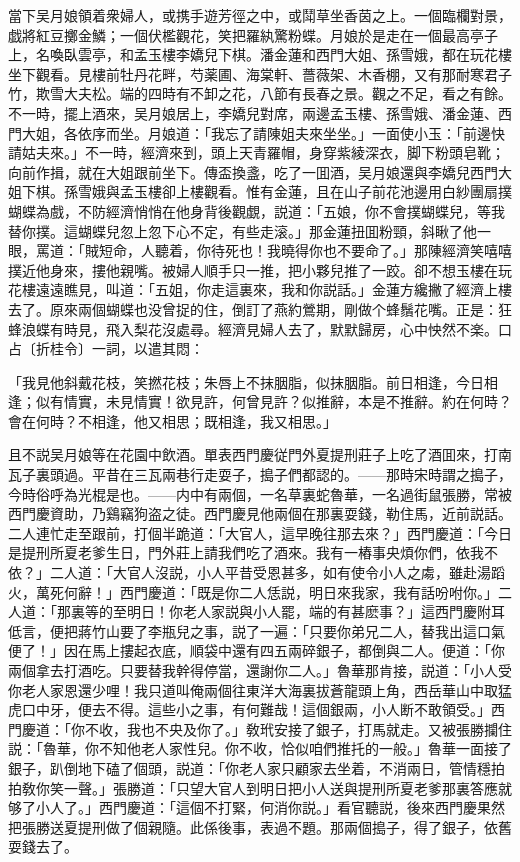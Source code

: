 當下吴月娘領着衆婦人，或携手遊芳徑之中，或鬦草坐香茵之上。一個臨欄對景，戯將紅豆擲金鱗；一個伏檻觀花，笑把羅紈驚粉蝶。月娘於是走在一個最高亭子上，名喚臥雲亭，和孟玉樓李嬌兒下棋。潘金蓮和西門大姐、孫雪娥，都在玩花樓坐下觀看。見樓前牡丹花畔，芍薬圃、海棠軒、薔薇架、木香棚，又有那耐寒君子竹，欺雪大夫松。端的四時有不卸之花，八節有長春之景。觀之不足，看之有餘。不一時，擺上酒來，吴月娘居上，李嬌兒對席，兩邊孟玉樓、孫雪娥、潘金蓮、西門大姐，各依序而坐。月娘道：「我忘了請陳姐夫來坐坐。」一面使小玉：「前邊快請姑夫來。」不一時，經濟來到，頭上天青羅帽，身穿紫綾深衣，脚下粉頭皂靴；向前作揖，就在大姐跟前坐下。傳盃換盞，吃了一囬酒，吴月娘還與李嬌兒西門大姐下棋。孫雪娥與孟玉樓卻上樓觀看。惟有金蓮，且在山子前花池邊用白紗團扇撲蝴蝶為戲，不防經濟悄悄在他身背後觀覷，説道：「五娘，你不會撲蝴蝶兒，等我替你撲。這蝴蝶兒忽上忽下心不定，有些走滚。」那金蓮扭囬粉頸，斜瞅了他一眼，罵道：「賊短命，人聽着，你待死也！我曉得你也不要命了。」那陳經濟笑嘻嘻撲近他身來，摟他親嘴。被婦人順手只一推，把小夥兒推了一跤。卻不想玉樓在玩花樓遠遠瞧見，叫道：「五姐，你走這裏來，我和你説話。」金蓮方纔撇了經濟上樓去了。原來兩個蝴蝶也没曾捉的住，倒訂了燕約鶯期，剛做个蜂鬚花嘴。正是：狂蜂浪蝶有時見，飛入梨花沒處尋。經濟見婦人去了，默默歸房，心中怏然不楽。口占〔折桂令〕一詞，以遣其悶：

\begin{myquote}
「我見他斜戴花枝，笑撚花枝；朱唇上不抹胭脂，似抹胭脂。前日相逢，今日相逢；似有情實，未見情實！欲見許，何曾見許？似推辭，本是不推辭。約在何時？會在何時？不相逢，他又相思；既相逢，我又相思。」
\end{myquote}

且不説吴月娘等在花園中飲酒。單表西門慶従門外夏提刑莊子上吃了酒囬來，打南瓦子裏頭過。平昔在三瓦兩巷行走耍子，搗子們都認的。——那時宋時謂之搗子，今時俗呼為光棍是也。——内中有兩個，一名草裏蛇魯華，一名過街鼠張勝，常被西門慶資助，乃鷄竊狗盗之徒。西門慶見他兩個在那裏耍錢，勒住馬，近前説話。二人連忙走至跟前，打個半跪道：「大官人，這早晚往那去來？」西門慶道：「今日是提刑所夏老爹生日，門外莊上請我們吃了酒來。我有一樁事央煩你們，依我不依？」二人道：「大官人沒説，小人平昔受恩甚多，如有使令小人之䖏，雖赴湯蹈火，萬死何辭！」西門慶道：「既是你二人恁説，明日來我家，我有話吩咐你。」二人道：「那裏等的至明日！你老人家説與小人罷，端的有甚麽事？」這西門慶附耳低言，便把蔣竹山要了李瓶兒之事，説了一遍：「只要你弟兄二人，替我出這口氣便了！」因在馬上摟起衣底，順袋中還有四五兩碎銀子，都倒與二人。便道：「你兩個拿去打酒吃。只要替我幹得停當，還謝你二人。」魯華那肯接，説道：「小人受你老人家恩還少哩！我只道叫俺兩個往東洋大海裏拔蒼龍頭上角，西岳華山中取猛虎口中牙，便去不得。這些小之事，有何難哉！這個銀兩，小人断不敢領受。」西門慶道：「你不收，我也不央及你了。」敎玳安接了銀子，打馬就走。又被張勝攔住説：「魯華，你不知他老人家性兒。你不收，恰似咱們推托的一般。」魯華一面接了銀子，趴倒地下磕了個頭，説道：「你老人家只顧家去坐着，不消兩日，管情穩拍拍敎你笑一聲。」張勝道：「只望大官人到明日把小人送與提刑所夏老爹那裏答應就够了小人了。」西門慶道：「這個不打緊，何消你説。」看官聽説，後來西門慶果然把張勝送夏提刑做了個親隨。此係後事，表過不題。那兩個搗子，得了銀子，依舊耍錢去了。

